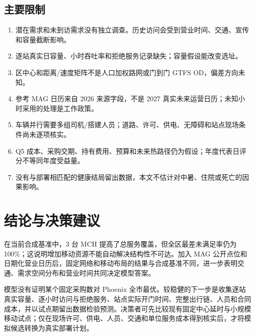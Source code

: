 \documentclass[12pt]{article}
\begin{document}
\subsection{主要限制}
\begin{enumerate}
    \item 潜在需求和未到访需求没有独立调查。历史访问会受到营业时间、交通、宣传和容量截断影响。
    \item 逐站真实日容量、小时吞吐率和拒绝服务记录缺失；容量假设能改变选址。
    \item 区中心和距离/速度矩阵不是人口加权路网或门到门 GTFS OD，偏差方向未知。
    \item 参考 MAG 日历来自 2026 来源字段，不是 2027 真实未来运营日历；未知小时采用的处理是工作政策。
    \item 车辆并行需要多组司机/搭建人员；道路、许可、供电、无障碍和站点现场条件尚未逐项核实。
    \item Q5 成本、采购交期、持有费用、预算和未来热路径仍为假设；年度代表日评分不等同年度受益量。
    \item 没有与部署相匹配的健康结局留出数据，本文不估计对中暑、住院或死亡的因果影响。
\end{enumerate}

\section{结论与决策建议}
在当前合成基准中，3 台 MCH 提高了总服务覆盖，但全区最差未满足率仍为 100\%；这说明增加移动资源不能自动解决结构性不可达。加入 MAG 公开点位和日期化营业日历后，固定网络和移动布局的结果与合成基准不同，进一步表明交通、需求空间分布和营业时间共同决定模型答案。

模型没有证明某个固定采购数对 Phoenix 全市最优。较稳健的下一步是收集逐站真实容量、逐小时访问与拒绝服务、站点实际开门时间、完整出行链、人员和合同成本，并以试点期留出数据检验预测。决策者可先比较现有固定中心延时与小规模移动试点；仅在现场许可、供电、人员、交通和单位服务成本得到核实后，才将模拟候选转换为真实部署计划。
\end{document}
